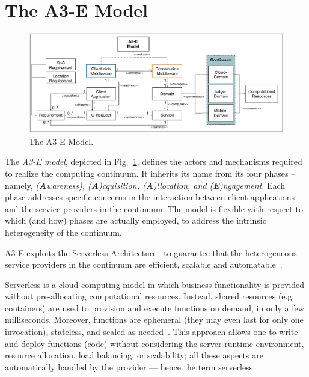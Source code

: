 \section{The A3-E Model}\label{sec:proposal}

\begin{figure}[tbp]
	\includegraphics[width=1\textwidth]{figs/A3-E-model.pdf}
	\caption{The A3-E Model.}
	\label{fig:A3-E-model}
\end{figure}

The \textit{A3-E model}, depicted in Fig.~\ref{fig:A3-E-model}, defines the actors and mechanisms required to realize the computing continuum. It inherits its name from its four phases -- namely, \textit{(\textbf{A}wareness), (\textbf{A})cquisition, (\textbf{A})llocation, and (\textbf{E})ngagement}. Each phase addresses specific concerns in the interaction between client applications and the service providers in the continuum. The model is flexible with respect to which (and how) phases are actually employed, to address the intrinsic heterogeneity of the continuum. 

A3-E exploits the Serverless Architecture~\cite{baldini2017serverless} to guarantee that the heterogeneous service providers in the continuum are efficient, scalable and automatable~\cite{GarrigaMendonca2017,Hendrickson:2016}. 

Serverless is a cloud computing model in which business functionality is provided without pre-allocating computational resources. Instead, shared resources (e.g. containers) are used to provision and execute functions on demand, in only a few milliseconds. Moreover, functions are ephemeral (they may even last for only one invocation), stateless, and scaled as needed~\cite{Roberts:2016}. This approach allows one to write and deploy functions (code) without considering the server runtime environment, resource allocation, load balancing, or scalability; all these aspects are automatically handled by the provider --- hence the term serverless.


